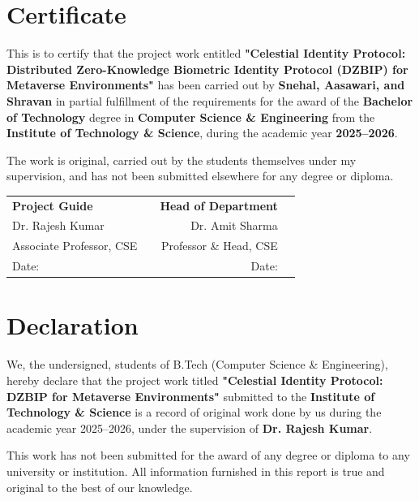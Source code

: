 \documentclass[12pt,a4paper,oneside]{report}
\begin{document}
\chapter*{Certificate}
This is to certify that the project work entitled \textbf{"Celestial Identity Protocol: Distributed Zero-Knowledge Biometric Identity Protocol (DZBIP) for Metaverse Environments"} has been carried out by \textbf{Snehal, Aasawari, and Shravan} in partial fulfillment of the requirements for the award of the \textbf{Bachelor of Technology} degree in \textbf{Computer Science \& Engineering} from the \textbf{Institute of Technology \& Science}, during the academic year \textbf{2025--2026}.

The work is original, carried out by the students themselves under my supervision, and has not been submitted elsewhere for any degree or diploma.

\vspace{3cm}
\noindent
\begin{tabular}{lcrc}
    \textbf{Project Guide} & \hspace{4cm} & \textbf{Head of Department} \\
    Dr. Rajesh Kumar & & Dr. Amit Sharma \\
    Associate Professor, CSE & & Professor \& Head, CSE \\
    Date: & & Date: \\
\end{tabular}

\newpage

\chapter*{Declaration}
We, the undersigned, students of B.Tech (Computer Science \& Engineering), hereby declare that the project work titled \textbf{"Celestial Identity Protocol: DZBIP for Metaverse Environments"} submitted to the \textbf{Institute of Technology \& Science} is a record of original work done by us during the academic year 2025--2026, under the supervision of \textbf{Dr. Rajesh Kumar}.

This work has not been submitted for the award of any degree or diploma to any university or institution. All information furnished in this report is true and original to the best of our knowledge.
\end{document}
